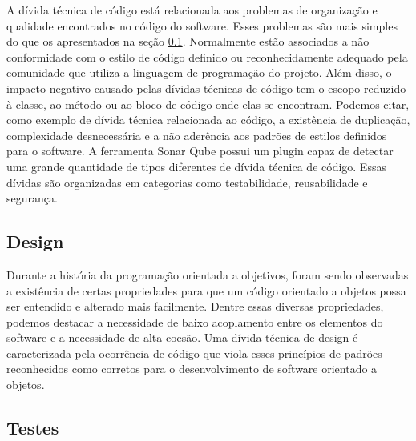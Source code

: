 A dívida técnica de código está relacionada aos problemas  de organização e qualidade encontrados no código do software. Esses problemas são mais simples do que os apresentados na seção \ref{tipo_td_design}. Normalmente estão associados a não conformidade com o estilo de código definido ou reconhecidamente adequado pela comunidade que utiliza a linguagem de programação do projeto. Além disso, o impacto negativo causado pelas dívidas técnicas de código tem o escopo reduzido à classe, ao método ou ao bloco de código onde elas se encontram.  Podemos citar, como exemplo de dívida técnica relacionada ao código, a existência de duplicação, complexidade desnecessária e a não aderência aos padrões de estilos definidos para o software. A ferramenta Sonar Qube \cite{campbell2013sonarqube} possui um plugin capaz de detectar uma grande quantidade de tipos diferentes de dívida técnica de código. Essas dívidas são organizadas em categorias como testabilidade, reusabilidade e segurança. 


\subsection{Design}
\label{tipo_td_design}

Durante a história da programação orientada a objetivos, foram sendo observadas a existência de certas propriedades para que um código orientado a objetos possa ser entendido e alterado mais facilmente.  Dentre essas diversas propriedades, podemos destacar a necessidade de baixo acoplamento entre os elementos do software e a necessidade de alta coesão. Uma dívida técnica de design é caracterizada pela ocorrência de código que viola esses princípios de padrões reconhecidos como corretos para o desenvolvimento de software orientado a objetos.  


\subsection{Testes}


